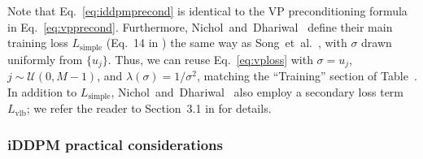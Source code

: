 Note that Eq.~\ref{eq:iddpmprecond} is identical to the VP preconditioning formula in Eq.~\ref{eq:vpprecond}.
Furthermore, Nichol~and~Dhariwal~\cite{Nichol2021a} define their main training loss $L_\text{simple}$ (Eq.~14 in \cite{Nichol2021a}) the same way as Song~et~al.~\cite{Song2021sde}, with $\sigma$ drawn uniformly from $\{u_j\}$.
Thus, we can reuse Eq.~\ref{eq:vploss} with $\sigma = u_j$, $j \sim \mathcal{U}(0, M-1)$, and $\lambda(\sigma) = 1 / \sigma^2$, matching the ``Training'' section of Table~.
In addition to $L_\text{simple}$, Nichol~and~Dhariwal~\cite{Nichol2021a} also employ a secondary loss term $L_\text{vlb}$; we refer the reader to Section~3.1 in \cite{Nichol2021a} for details.

\subsubsection{iDDPM practical considerations}

